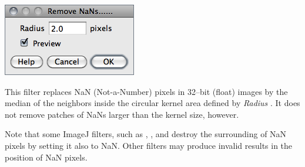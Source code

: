 \begin{minipage}[c][1\totalheight][t]{0.323\columnwidth}%
\includegraphics[scale=0.55]{images/RemoveNaNs}%
\end{minipage}%
\begin{minipage}[c][1\totalheight][t]{0.677\columnwidth}%
This filter replaces NaN (Not-a-Number) pixels in 32--bit
(float) images by the median of the neighbors inside the circular
kernel area defined by \emph{Radius} \cite{C-RemoveNaNs}. It does
not remove patches of NaNs larger than the kernel size, however. %
\end{minipage}\medskip{}


Note that some ImageJ filters, such as ,
, and 
destroy the surrounding of NaN pixels by setting it also to NaN. Other
filters may produce invalid results in the position of NaN pixels.




\subsection{\protect{}\label{sub:Shadows}}

